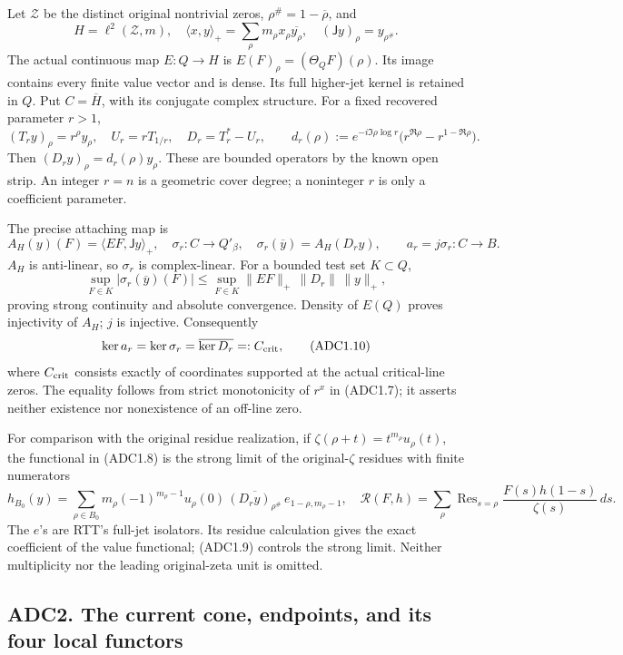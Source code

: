 Let \(\mathscr Z\) be the distinct original nontrivial zeros,
\(\rho^\#=1-\overline\rho\), and \[
H=\ell^2(\mathscr Z,m),\quad
\langle x,y\rangle_+=\sum_\rho m_\rho x_\rho\overline{y_\rho},
\quad(\mathsf Jy)_\rho=y_{\rho^\#}.
\] The actual continuous map \(E:Q\to H\) is
\(E(F)_\rho=(\Theta_QF)(\rho)\). Its image contains every finite value
vector and is dense. Its full higher-jet kernel is retained in \(Q\).
Put \(C=\overline H\), with its conjugate complex structure. For a fixed
recovered parameter \(r>1\), \[
(T_ry)_\rho=r^\rho y_\rho,\quad U_r=rT_{1/r},\quad
D_r=T_r^*-U_r,\qquad
d_r(\rho):=e^{-i\Im\rho\log r}
 \bigl(r^{\Re\rho}-r^{1-\Re\rho}\bigr).
\tag{ADC1.7}
\] Then \((D_ry)_\rho=d_r(\rho)y_\rho\). These are bounded operators by
the known open strip. An integer \(r=n\) is a geometric cover degree; a
noninteger \(r\) is only a coefficient parameter.

The precise attaching map is \[
A_H(y)(F)=\langle EF,\mathsf Jy\rangle_+,\quad
\sigma_r:C\to Q'_\beta,\quad
\sigma_r(\overline y)=A_H(D_ry),\qquad
a_r=j\sigma_r:C\to B.
\tag{ADC1.8}
\] \(A_H\) is anti-linear, so \(\sigma_r\) is complex-linear. For a
bounded test set \(K\subset Q\), \[
\sup_{F\in K}|\sigma_r(\overline y)(F)|
\leq \sup_{F\in K}\|EF\|_+\,\|D_r\|\,\|y\|_+,
\tag{ADC1.9}
\] proving strong continuity and absolute convergence. Density of
\(E(Q)\) proves injectivity of \(A_H\); \(j\) is injective. Consequently
\[
\ker a_r=\ker\sigma_r=\overline{\ker D_r}
 =:C_{\rm crit},
\tag{ADC1.10}
\] where \(C_{\rm crit}\) consists exactly of coordinates supported at
the actual critical-line zeros. The equality follows from strict
monotonicity of \(r^x\) in (ADC1.7); it asserts neither existence nor
nonexistence of an off-line zero.

For comparison with the original residue realization, if
\(\zeta(\rho+t)=t^{m_\rho}u_\rho(t)\), the functional in (ADC1.8) is the
strong limit of the original-\(\zeta\) residues with finite numerators
\[
h_{B_0}(y)=\sum_{\rho\in B_0}
m_\rho(-1)^{m_\rho-1}u_\rho(0)\,
\overline{(D_ry)_{\rho^\#}}\,
e_{1-\rho,m_\rho-1},
\quad
\mathcal R(F,h)=\sum_\rho\operatorname{Res}_{s=\rho}
\frac{F(s)h(1-s)}{\zeta(s)}\,ds.
\tag{ADC1.11}
\] The \(e\)'s are RTT's full-jet isolators. Its residue calculation
gives the exact coefficient of the value functional; (ADC1.9) controls
the strong limit. Neither multiplicity nor the leading original-zeta
unit is omitted.

\subsection{ADC2. The current cone, endpoints, and its four local
functors}\label{adc2.-the-current-cone-endpoints-and-its-four-local-functors}

